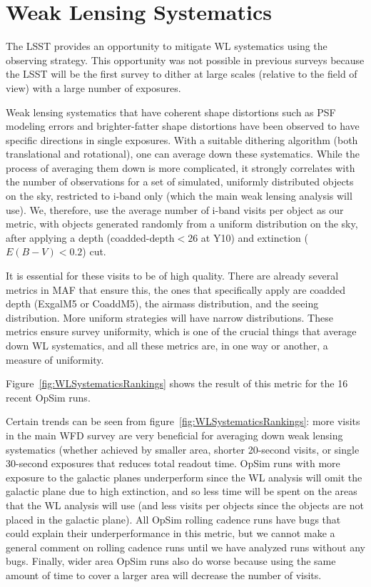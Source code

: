 \section{Weak Lensing Systematics}

The LSST provides an opportunity to mitigate WL systematics using the observing strategy. This opportunity was not possible in previous surveys because the LSST will be the first survey to dither at large scales (relative to the field of view) with a large number of exposures.

Weak lensing systematics that have coherent shape distortions such as PSF modeling errors and brighter-fatter shape distortions have been observed to have specific directions in single exposures. With a suitable dithering algorithm (both translational and rotational), one can average down these systematics. While the process of averaging them down is more complicated, it strongly correlates with the number of observations for a set of simulated, uniformly distributed objects on the sky, restricted to i-band only (which the main weak lensing analysis will use). We, therefore, use the average number of i-band visits per object as our metric, with objects generated randomly from a uniform distribution on the sky, after applying a depth (coadded-depth$<26$ at Y10) and extinction ($E(B-V)<0.2$) cut.

It is essential for these visits to be of high quality. There are already several metrics in MAF that ensure this, the ones that specifically apply are coadded depth (ExgalM5 or CoaddM5), the airmass distribution, and the seeing distribution. More uniform strategies will have narrow distributions. These metrics ensure survey uniformity, which is one of the crucial things that average down WL systematics, and all these metrics are, in one way or another, a measure of uniformity.

Figure~\ref{fig:WLSystematicsRankings} shows the result of this metric for the 16 recent OpSim runs. 

Certain trends can be seen from  figure~\ref{fig:WLSystematicsRankings}: more visits in the main WFD survey are very beneficial for averaging down weak lensing systematics (whether achieved by smaller area, shorter 20-second visits, or single 30-second exposures that reduces total readout time. OpSim runs with more exposure to the galactic planes underperform since the WL analysis will omit the galactic plane due to high extinction, and so less time will be spent on the areas that the WL analysis will use (and less visits per objects since the objects are not placed in the galactic plane). All OpSim rolling cadence runs have bugs that could explain their underperformance in this metric, but we cannot make a general comment on rolling cadence runs until we have analyzed runs without any bugs. Finally, wider area OpSim runs also do worse because using the same amount of time to cover a larger area will decrease the number of visits.

